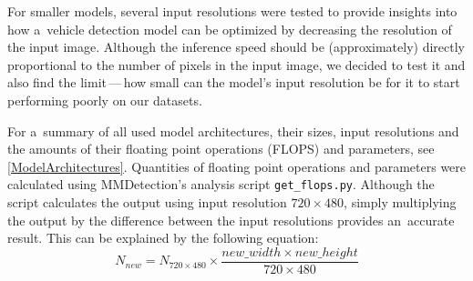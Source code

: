 For smaller models, several input resolutions were tested to provide insights
into how a~vehicle detection model can be optimized by decreasing the resolution
of the input image. Although the inference speed should be (approximately)
directly proportional to the number of pixels in the input image, we decided to
test it and also find the limit\,---\,how small can the model's input resolution
be for it to start performing poorly on our datasets.

For a~summary of all used model architectures, their sizes, input resolutions and the
amounts of their floating point operations (FLOPS) and parameters, see
\autoref{ModelArchitectures}. Quantities of floating point operations and
parameters were calculated using MMDetection's analysis script
\verb|get_flops.py|. Although the script calculates the output using input
resolution $720 \times 480$, simply multiplying the output by the difference
between the input resolutions provides an~accurate result. This can be explained
by the following equation:
\begin{equation}
    N_{new} = N_{720 \times 480} \times \frac{new\_width \times new\_height}{720 \times 480}
\end{equation}

